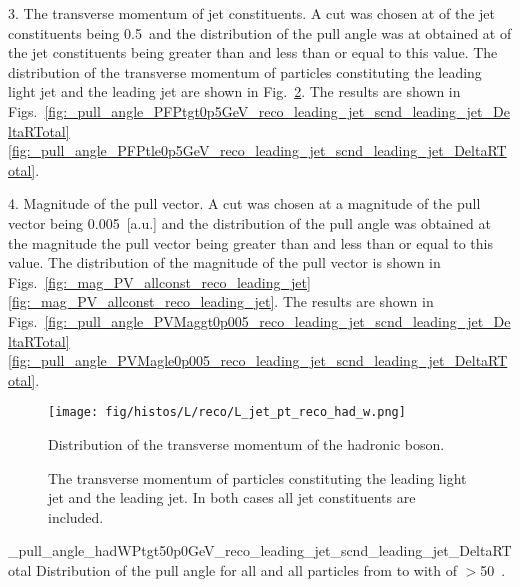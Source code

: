 3. The transverse momentum \pt of jet constituents. A cut was chosen at \pt of the jet constituents being 0.5~\GeV and the distribution of the pull angle was at obtained at \pt of the jet constituents being greater than and less than or equal to this value. The distribution of the transverse momentum of particles constituting the leading light jet and the leading \cPqb jet are shown in Fig.~\ref{fig:L_JetConstPT_allconst_reco}. The results are shown in Figs.~\ref{fig:_pull_angle_PFPtgt0p5GeV_reco_leading_jet_scnd_leading_jet_DeltaRTotal}\textendash\ref{fig:_pull_angle_PFPtle0p5GeV_reco_leading_jet_scnd_leading_jet_DeltaRTotal}.

4. Magnitude of the pull vector. A cut was chosen at a magnitude of the pull vector being 0.005~[a.u.] and the distribution of the pull angle was obtained at the magnitude the pull vector being greater than and less than or equal to this value. The distribution of the magnitude of the pull vector is shown in Figs.~\ref{fig:_mag_PV_allconst_reco_leading_jet}\textendash\ref{fig:_mag_PV_allconst_reco_leading_jet}. The results are shown in Figs.~\ref{fig:_pull_angle_PVMaggt0p005_reco_leading_jet_scnd_leading_jet_DeltaRTotal}\textendash\ref{fig:_pull_angle_PVMagle0p005_reco_leading_jet_scnd_leading_jet_DeltaRTotal}.

\begin{figure}
\centering
\texttt{[image: fig/histos/L/reco/L\_jet\_pt\_reco\_had\_w.png]}
\caption{Distribution of the transverse momentum \pt of the hadronic \PW boson.}
\label{fig:L_jet_pt_reco_had_w}
\end{figure}

\begin{figure}[hbtp]
    \centering
        \def\twidth{0.45}
\caption{The transverse momentum \pt of particles constituting the leading light jet and the leading \cPqb jet. In both cases all jet constituents are included.}
\label{fig:L_JetConstPT_allconst_reco}

\end{figure}

     {_pull_angle_hadWPtgt50p0GeV_reco_leading_jet_scnd_leading_jet_DeltaRTotal}
     {Distribution of the pull angle for all \DeltaR and all particles from \leadingjet to \scndleadingjet with \pt of \PW $>$50~\GeV.}

